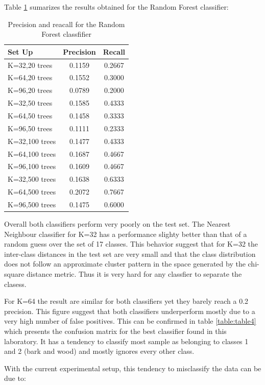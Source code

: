 \documentclass[a4paper]{article}
\begin{document}
Table \ref{table:table2}  sumarizes the results obtained for the Random Forest classifier:

\begin{table}[t]
\centering
\begin{tabular}{ l | c | c}
Set Up & Precision & Recall   \\
\hline	
K=32,20 trees & 0.1159 & 0.2667 \\
K=64,20 trees & 0.1552 & 0.3000 \\
K=96,20 trees & 0.0789  &  0.2000 \\
K=32,50 trees & 0.1585 & 0.4333 \\
K=64,50 trees & 0.1458 & 0.3333 \\
K=96,50 trees &  0.1111 &  0.2333\\
K=32,100 trees & 0.1477 & 0.4333  \\
K=64,100 trees & 0.1687 & 0.4667  \\
K=96,100 trees & 0.1609 &  0.4667\\
K=32,500 trees & 0.1638 & 0.6333  \\
K=64,500 trees & 0.2072  &  0.7667 \\
K=96,500 trees & 0.1475 & 0.6000  \\

\end{tabular}
\caption{Precision and reacall for the Random Forest classfifier}
\label{table:table2}
\end{table}


Overall both classifiers perform very poorly on the test set. The Nearest Neighbour classifier for K=32 has a performance slighty better than that of a random guess over the set of 17 classes. This behavior suggest that for K=32 the inter-class distances in the test set are very small and that the class distribution does not follow an approximate cluster pattern in the space generated by the chi-square distance metric. Thus it is very hard for any classfier to separate the clasess.

For K=64 the result are similar for both classifiers yet they barely reach a 0.2 precision. This figure suggest that both classifiers underperform mostly due to a very high number of false positives. This can be confirmed in table \ref{table:table4} which presents the confusion matrix for the best classifier found in this laboratory. It has a tendency to classify most sample as belonging to classes 1 and 2 (bark and wood) and mostly ignores every other class.

With the current experimental setup, this tendency to misclassify the data can be due to:
\end{document}
